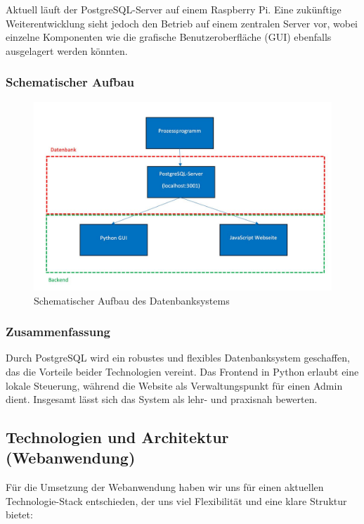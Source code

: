 Aktuell läuft der PostgreSQL-Server auf einem Raspberry Pi. Eine zukünftige Weiterentwicklung sieht jedoch den Betrieb auf einem zentralen Server vor, wobei einzelne Komponenten wie die grafische Benutzeroberfläche (GUI) ebenfalls ausgelagert werden könnten.


\subsubsection{Schematischer Aufbau}\label{subsubsec:schematischer_aufbau}

\begin{figure}[h]
	\centering
	\includegraphics[width=0.7\linewidth]{figures/Schematischer Aufbau.jpeg}
	\caption[Schematischer Aufbau]{Schematischer Aufbau des Datenbanksystems}\label{fig:schematischer_aufbau}
\end{figure}


\subsubsection{Zusammenfassung}\label{subsubsec:zusammenfassung}

Durch PostgreSQL wird ein robustes und flexibles Datenbanksystem geschaffen, das die Vorteile beider Technologien vereint. Das Frontend in Python erlaubt eine lokale Steuerung, während die Website als Verwaltungspunkt für einen Admin dient. Insgesamt lässt sich das System als lehr- und praxisnah bewerten.


\subsection{Technologien und Architektur (Webanwendung)}

Für die Umsetzung der Webanwendung haben wir uns für einen aktuellen Tech\-no\-lo\-gie-Stack entschieden, der uns viel Flexibilität und eine klare Struktur bietet:

